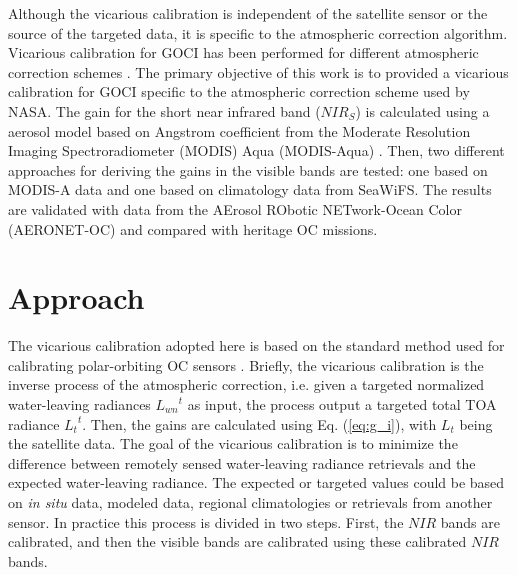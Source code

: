 \documentclass[10pt]{article}
\begin{document}
Although the vicarious calibration is independent of the satellite sensor or the source of the targeted data, it is specific to the atmospheric correction algorithm\cite{Franz:07}. 
Vicarious calibration for GOCI has been performed for different atmospheric correction schemes \cite{Ahn2015,Wang:13}.
The primary objective of this work is to provided a vicarious calibration for GOCI specific to the atmospheric correction scheme used by NASA.
The gain for the short near infrared band ($NIR_S$) is calculated using a aerosol model based on Angstrom coefficient from the Moderate Resolution Imaging Spectroradiometer (MODIS) Aqua (MODIS-Aqua) \cite{Esaias1998}.
Then, two different approaches for deriving the gains in the visible bands are tested: one based on MODIS-A data and one based on climatology data from SeaWiFS. The results are validated with data from the AErosol RObotic NETwork-Ocean Color (AERONET-OC)\cite{Zibordi2009} and compared with heritage OC missions.

\section{Approach}
The vicarious calibration adopted here is based on the standard method used for calibrating polar-orbiting OC sensors \cite{Franz:07}.
Briefly, the vicarious calibration is the inverse process of the atmospheric correction, i.e. given a targeted normalized water-leaving radiances ${L_{wn}}^t$ as input, the process output a targeted total TOA radiance ${L_t}^t$. 
Then, the gains are calculated using Eq. (\ref{eq:g_i}), with $L_t$ being the satellite data. 
The goal of the vicarious calibration is to minimize the difference between remotely sensed water-leaving radiance retrievals and the expected water-leaving radiance. 
The expected or targeted values could be based on {\it in situ} data, modeled data, regional climatologies or retrievals from another sensor.
In practice this process is divided in two steps.
First, the $NIR$ bands are calibrated, and then the visible bands are calibrated using these calibrated $NIR$ bands. 
\end{document}
